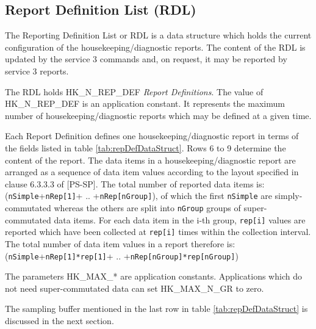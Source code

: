 \documentclass[a4paper,10pt]{article}
\begin{document}
\subsection{Report Definition List (RDL)}\label{sec:serv3RDL}
The Reporting Definition List or RDL is a data structure which holds the current configuration of the housekeeping/diagnostic reports. The content of the RDL is updated by the service 3 commands and, on request, it may be reported by service 3 reports.

The RDL holds HK\_N\_REP\_DEF \textit{Report Definitions}. The value of HK\_N\_REP\_DEF is an application constant. It represents the maximum number of housekeeping/diagnostic reports which may be defined at a given time. 

Each Report Definition defines one housekeeping/diagnostic report in terms of the fields listed in table \ref{tab:repDefDataStruct}. Rows 6 to 9 determine the content of the report. The data items in a housekeeping/diagnostic report are arranged as a sequence of data item values according to the layout specified in clause 6.3.3.3 of [PS-SP]. The total number of reported data items is: (\texttt{nSimple}+\texttt{nRep[1]}+ .. +\texttt{nRep[nGroup]}), of which the first \texttt{nSimple} are simply-commutated whereas the others are split into \texttt{nGroup} groups of super-commutated data items. For each data item in the i-th group, \texttt{rep[i]} values are reported which have been collected at \texttt{rep[i]} times within the collection interval. The total number of data item values in a report therefore is: (\texttt{nSimple}+\texttt{nRep[1]*rep[1]}+ .. +\texttt{nRep[nGroup]*rep[nGroup]})

The parameters HK\_MAX\_* are application constants. Applications which do not need super-commutated data can set HK\_MAX\_N\_GR to zero.

The sampling buffer mentioned in the last row in table \ref{tab:repDefDataStruct} is discussed in the next section.
\end{document}
